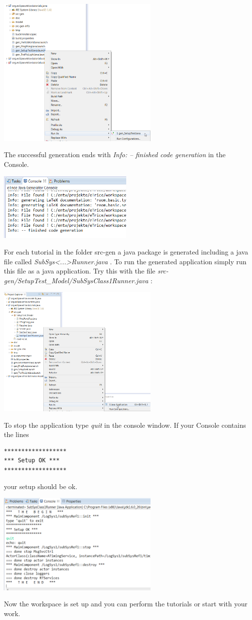 \includegraphics[width=0.6\textwidth]{images/013-SetupWorkspace05.png}

The successful generation ends with \emph{Info: -- finished code generation} in the Console.

\includegraphics[width=0.5\textwidth]{images/013-SetupWorkspace051.png}

For each tutorial in the folder src-gen a java package is generated including a java file called 
\emph{SubSys<...>Runner.java} . To run the generated application simply run this file as a java application.
Try this with the file \emph{src-gen/SetupTest\_Model/SubSysClass1Runner.java} :

\includegraphics[width=0.6\textwidth]{images/013-SetupWorkspace06.png}

To stop the application type \emph{quit} in the console window. If your Console contains the lines
\begin{verbatim}
******************
*** Setup OK ***
******************
\end{verbatim}
your setup should be ok.

\includegraphics[width=0.6\textwidth]{images/013-SetupWorkspace07.png} 

Now the workspace is set up and you can perform the tutorials or start with your work.
